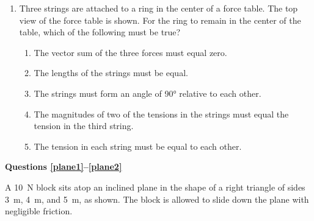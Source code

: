 \documentclass{../../../oss-classkick}
\begin{document}
\begin{multicols*}{2}
\begin{enumerate}[resume,leftmargin=18pt]
  \item Three strings are attached to a ring in the center of a force table. The
    top view of the force table is shown. For the ring to remain in the
    center of the table, which of the following must be true?
    \begin{center}
    \end{center}
    \begin{enumerate}[nosep,leftmargin=18pt,label=(\Alph*)]
    \item The vector sum of the three forces must equal zero.
    \item The lengths of the strings must be equal.
    \item The strings must form an angle of \ang{90} relative to each other.
    \item The magnitudes of two of the tensions in the strings must equal the
      tension in the third string.
    \item The tension in each string must be equal to each other.
    \end{enumerate}  
  \end{enumerate}
  
  \textbf{Questions \ref{plane1}--\ref{plane2}}

  A \SI{10}{\newton} block sits atop an inclined plane in the shape of a
  right triangle of sides \SI{3}{\metre}, \SI{4}{\metre}, and \SI{5}{\metre},
  as shown. The block is allowed to slide down the plane with negligible
  friction.
  \begin{center}
  \end{center}
  

\end{multicols*}
\end{document}
